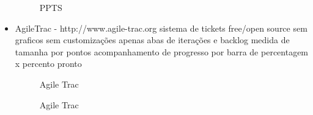 \begin{itemize}
\begin{figure}[htbp]
  \centering
  \caption{PPTS}
\end{figure}

\item AgileTrac - http://www.agile-trac.org
sistema de tickets
free/open source
sem graficos
sem customizações
apenas abas de iterações e backlog
medida de tamanha por pontos
acompanhamento de progresso por barra de percentagem x percento pronto

\begin{figure}[htbp]
  \centering
  \caption{Agile Trac}
\end{figure}

\begin{figure}[htbp]
  \centering
  \caption{Agile Trac}
\end{figure}


\end{itemize}
